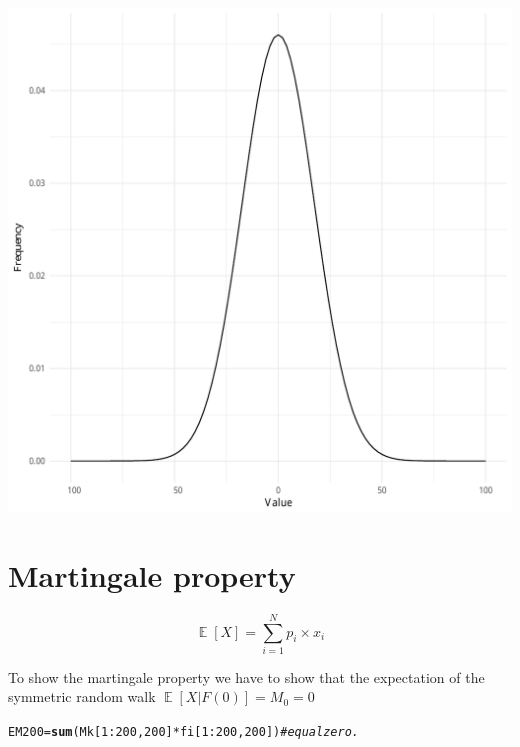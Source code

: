 \documentclass{article}\usepackage[]{graphicx}\usepackage[]{color}
\makeatletter
\def\maxwidth{ %
  \ifdim\Gin@nat@width>\linewidth
    \linewidth
  \else
    \Gin@nat@width
  \fi
}
\newcommand{\hlnum}[1]{\textcolor[rgb]{0.686,0.059,0.569}{#1}}%
\newcommand{\hlcom}[1]{\textcolor[rgb]{0.678,0.584,0.686}{\textit{#1}}}%
\newcommand{\hlopt}[1]{\textcolor[rgb]{0,0,0}{#1}}%
\newcommand{\hlstd}[1]{\textcolor[rgb]{0.345,0.345,0.345}{#1}}%
\newcommand{\hlkwb}[1]{\textcolor[rgb]{0.69,0.353,0.396}{#1}}%
\newcommand{\hlkwd}[1]{\textcolor[rgb]{0.737,0.353,0.396}{\textbf{#1}}}%
\newenvironment{kframe}{%
 \def\at@end@of@kframe{}%
 \ifinner\ifhmode%
  \def\at@end@of@kframe{\end{minipage}}%
  \begin{minipage}{\columnwidth}%
 \fi\fi%
 \def\FrameCommand##1{\hskip\@totalleftmargin \hskip-\fboxsep
 \colorbox{shadecolor}{##1}\hskip-\fboxsep
     \hskip-\linewidth \hskip-\@totalleftmargin \hskip\columnwidth}%
 \MakeFramed {\advance\hsize-\width
   \@totalleftmargin\z@ \linewidth\hsize
   \@setminipage}}%
 {\par\unskip\endMakeFramed%
 \at@end@of@kframe}
\newenvironment{knitrout}{}{} %
\makeatother
\begin{document}
\begin{knitrout}
\begin{kframe}
{\ttfamily\noindent\color{warningcolor}{\#\# Warning: Removed 200 rows containing missing values (geom\_path).}}\end{kframe}
\includegraphics[width=\maxwidth]{figure/unnamed-chunk-7-1} 

\end{knitrout}


\section{Martingale property}

\begin{equation}
\mathop{\mathbb{E}}[X] = \sum_{i=1}^N p_i \times x_i
\end{equation}

To show the martingale property we have to show that the expectation of the symmetric random walk $\mathop{\mathbb{E}}[X|F(0)] = M_0 = 0$

\begin{knitrout}
\color{fgcolor}\begin{kframe}
\begin{alltt}
 \hlstd{EM200} \hlkwb{=} \hlkwd{sum}\hlstd{(Mk[}\hlnum{1}\hlopt{:}\hlnum{200}\hlstd{,} \hlnum{200}\hlstd{]} \hlopt{*} \hlstd{fi[}\hlnum{1}\hlopt{:}\hlnum{200}\hlstd{,} \hlnum{200}\hlstd{])} \hlcom{# equal zero.}
\end{alltt}
\end{kframe}
\end{knitrout}




 
           
\end{document}

